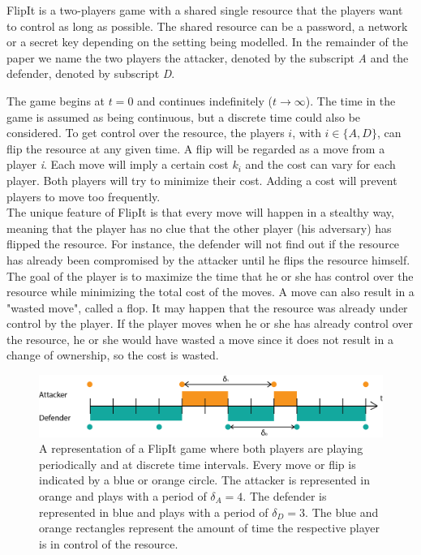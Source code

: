 \documentclass[journal,a4paper]{IEEEtran}
\begin{document}
FlipIt is a two-players game with a shared single resource that the players want to control as long as possible. The shared resource can be a password, a network or a secret key depending on the setting being modelled. In the remainder of the paper we name the two players the attacker, denoted by the subscript \textit{A} and the defender, denoted by subscript \textit{D}. 

The game begins at $t=0$ and continues indefinitely ($t \rightarrow \infty $). The time in the game is assumed as being continuous, but a discrete time could also be considered. To get control over the resource, the players $i$, with $i \in \{A,D\}$, can flip the resource at any given time. A flip will be regarded as a move from a player \textit{i}. Each move will imply a certain cost $k_{i}$ and the cost can vary for each player. Both players will try to minimize their cost. Adding a cost will prevent players to move too frequently. \\

The unique feature of FlipIt is that every move will happen in a stealthy way, meaning that the player has no clue that the other player (his adversary) has flipped the resource. For instance, the defender will not find out if the resource has already been compromised by the attacker until he flips the resource himself. The goal of the player is to maximize the time that he or she has control over the resource while minimizing the total cost of the moves. A move can also result in a "wasted move", called a flop. It may happen that the resource was already under control by the player. If the player moves when he or she has already control over the resource, he or she would have wasted a move since it does not result in a change of ownership, so the cost is wasted. \\


\begin{figure}[hbtp]
\centering
\includegraphics[scale=0.5]{../../doc/template/Images/DefFlipit}
\caption{A representation of a FlipIt game where both players are playing periodically and at discrete time intervals. Every move or flip is indicated by a blue or orange circle. The attacker is represented in orange and plays with a period of $\delta_{A}=4$. The defender is represented in blue and plays with a period of $\delta_{D}=3$. The blue and orange rectangles represent the amount of time the respective player is in control of the resource.}
\label{fig:FLipItDefault}
\end{figure}
\end{document}
